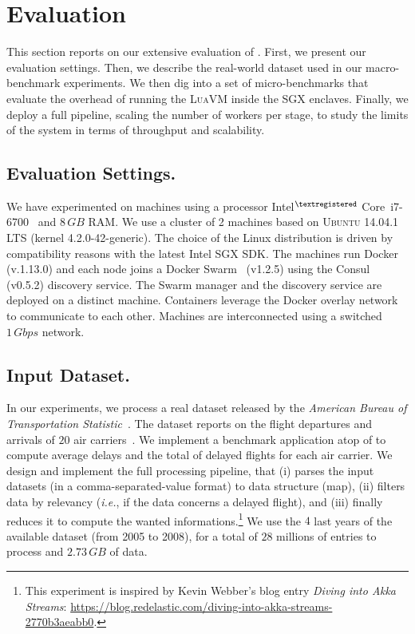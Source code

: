 \section{Evaluation}\label{sec:eval}
This section reports on our extensive evaluation of \SYS{}.
First, we present our evaluation settings.
Then, we describe the real-world dataset used in our macro-benchmark experiments.
We then dig into a set of micro-benchmarks that evaluate the overhead of running the \textsc{LuaVM} inside the SGX enclaves.
Finally, we deploy a full \SYS{} pipeline, scaling the number of workers per stage, to study the limits of the system in terms of throughput and scalability.


\subsection{Evaluation Settings.}
We have experimented on machines using a processor Intel$^{\tiny{\textregistered}}$ Core\texttrademark~i7-6700~\cite{intel:i7_6700} and $8\,GB$ RAM.
We use a cluster of 2 machines based on \textsc{Ubuntu} 14.04.1 LTS (kernel 4.2.0-42-generic).
The choice of the Linux distribution is driven by compatibility reasons with the latest Intel SGX SDK.
The machines run Docker (v.1.13.0) and each node joins a Docker Swarm~\cite{docker:swarm_2016} (v1.2.5) using the Consul~\cite{consul} (v0.5.2) discovery service.
The Swarm manager and the discovery service are deployed on a distinct machine.
Containers leverage the Docker overlay network to communicate to each other.
Machines are interconnected using a switched $1\,Gbps$ network.



\subsection{Input Dataset.}
In our experiments, we process a real dataset released by the \emph{American Bureau of Transportation Statistic}~\cite{rita:bts}.
The dataset reports on the flight departures and arrivals of $20$ air carriers~\cite{statistical_computing:data}.
We implement a benchmark application atop of \SYS{} to compute average delays and the total of delayed flights for each air carrier.
We design and implement the full processing pipeline, that (i) parses the input datasets (in a comma-separated-value format) to data structure (\textsf{map}), (ii) filters data by relevancy (\emph{i.e.}, if the data concerns a delayed flight), and (iii) finally reduces it to compute the wanted informations.\footnote{This experiment is inspired by Kevin Webber's blog entry \emph{Diving into Akka Streams}: \url{https://blog.redelastic.com/diving-into-akka-streams-2770b3aeabb0}.}
We use the $4$ last years of the available dataset (from 2005 to 2008), for a total of $28$ millions of entries to process and $2.73\,GB$ of data.

